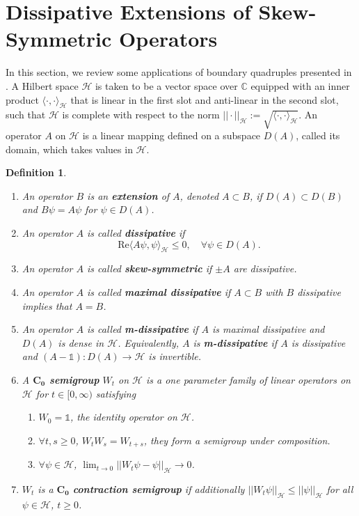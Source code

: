 \documentclass{article}
\numberwithin{equation}{section}
\newtheorem{definition}{Definition}[section]
\begin{document}
\section{Dissipative Extensions of Skew-Symmetric Operators}
In this section, we review some applications of boundary quadruples presented in \cite{Arendt2023}. A Hilbert space $\mathcal{H}$ is taken to be a vector space over $\mathbb{C}$ equipped with an inner product $\langle \cdot, \cdot \rangle_{\mathcal{H}}$ that is linear in the first slot and anti-linear in the second slot, such that $\mathcal{H}$ is complete with respect to the norm $||\cdot||_{\mathcal{H}}:=\sqrt{\langle \cdot, \cdot \rangle_{\mathcal{H}}}$. An operator $A$ on $\mathcal{H}$ is a linear mapping defined on a subspace $D(A)$, called its domain, which takes values in $\mathcal{H}$. 
\begin{definition}
    \begin{enumerate}
        \item[(a)] An operator $B$ is an \textbf{extension} of $A$, denoted $A \subset B$, if $D(A)\subset D(B)$ and $B\psi=A\psi$ for $\psi \in D(A)$. 
        \item[(b)] An operator $A$ is called \textbf{dissipative} if 
        \begin{equation}
            \text{Re}\langle A\psi,\psi \rangle_{\mathcal{H}} \leq 0, \quad \forall \psi \in D(A). \end{equation}
        \item[(c)] An operator $A$ is called \textbf{skew-symmetric} if $\pm A$ are dissipative.
       
        \item[(d)] An operator $A$ is called \textbf{maximal dissipative} if $A\subset B$ with $B$ dissipative implies that $A=B$. 
        \item[(e)] An operator $A$ is called \textbf{m-dissipative} if $A$ is maximal dissipative and $D(A)$ is dense in $\mathcal{H}$. Equivalently, $A$ is \textbf{m-dissipative} if $A$ is dissipative and $(A-\mathds{1}):D(A)\to\mathcal{H}$ is invertible. 
        \item[(f)] A \textbf{$\mathbf{C_0}$ semigroup} $W_t$ on $\mathcal{H}$ is a one parameter family of linear operators on $\mathcal{H}$ for $t\in[0,\infty)$ satisfying
        \begin{enumerate}
            \item[1.] $W_0=\mathds{1}$, the identity operator on $\mathcal{H}$.
            \item[2.] $\forall t,s \geq 0$, $W_t W_s=W_{t+s}$, they form a semigroup under composition.
            \item[3.] $\forall \psi \in \mathcal{H}$,  $\lim_{t \to 0}||W_t\psi - \psi||_{\mathcal{H}} \to 0$.
        \end{enumerate}
       \item[(g)]  $W_t$ is a $\mathbf{C_0}$ \textbf{contraction semigroup} if additionally $||W_t \psi||_{\mathcal{H}}\leq ||\psi||_{\mathcal{H}}$ for all $\psi \in \mathcal{H}$, $t \geq 0$.
    \end{enumerate}
\end{definition}
\end{document}
